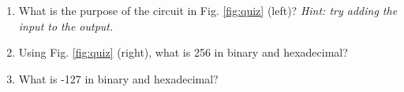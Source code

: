 \documentclass{article}
\begin{document}
\begin{enumerate}
\item What is the purpose of the circuit in Fig. \ref{fig:quiz} (left)? \textit{Hint: try adding the input to the output.}
\item Using Fig. \ref{fig:quiz} (right), what is 256 in binary and hexadecimal?
\item What is -127 in binary and hexadecimal?
\end{enumerate}
\end{document}
